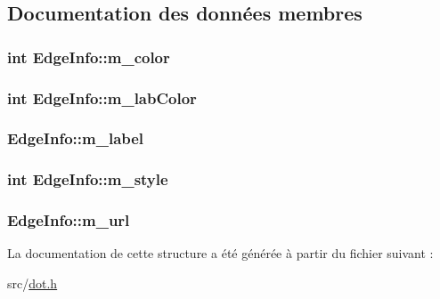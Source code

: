 \subsection{Documentation des données membres}
\hypertarget{struct_edge_info_a67f74484abac64da6f84291550232430}{}
\subsubsection[{m\+\_\+color}]{\setlength{\rightskip}{0pt plus 5cm}int Edge\+Info\+::m\+\_\+color}\label{struct_edge_info_a67f74484abac64da6f84291550232430}
\hypertarget{struct_edge_info_a1074753351376c3d894e3a1777a643d1}{}
\subsubsection[{m\+\_\+lab\+Color}]{\setlength{\rightskip}{0pt plus 5cm}int Edge\+Info\+::m\+\_\+lab\+Color}\label{struct_edge_info_a1074753351376c3d894e3a1777a643d1}
\hypertarget{struct_edge_info_ab735a4292f619dc43efb887bc4b42119}{}
\subsubsection[{m\+\_\+label}]{ Edge\+Info\+::m\+\_\+label}\label{struct_edge_info_ab735a4292f619dc43efb887bc4b42119}
\hypertarget{struct_edge_info_a9cd01dc1ff370a261f5850a1fa5812f9}{}
\subsubsection[{m\+\_\+style}]{\setlength{\rightskip}{0pt plus 5cm}int Edge\+Info\+::m\+\_\+style}\label{struct_edge_info_a9cd01dc1ff370a261f5850a1fa5812f9}
\hypertarget{struct_edge_info_a0f0c4b78066f2ed4ed4e453ad8fdf428}{}
\subsubsection[{m\+\_\+url}]{ Edge\+Info\+::m\+\_\+url}\label{struct_edge_info_a0f0c4b78066f2ed4ed4e453ad8fdf428}


La documentation de cette structure a été générée à partir du fichier suivant \+:\begin{DoxyCompactItemize}
\item 
src/\hyperlink{dot_8h}{dot.\+h}\end{DoxyCompactItemize}
